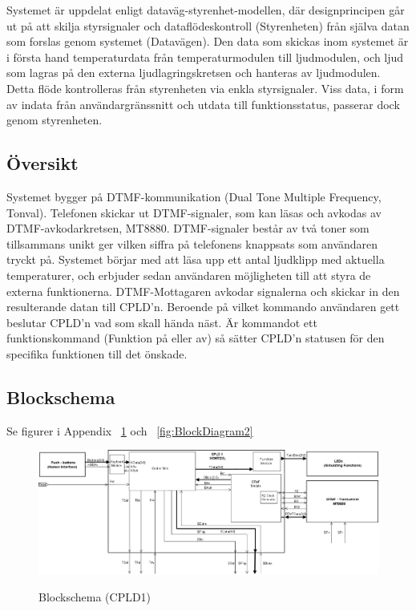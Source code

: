 \documentclass[a4paper,11pt]{article}
\begin{document}
	Systemet är uppdelat enligt dataväg-styrenhet-modellen, där designprincipen går ut på att skilja styrsignaler
	och dataflödeskontroll (Styrenheten) från själva datan som forslas genom systemet (Datavägen). Den data som
	skickas inom systemet är i första hand temperaturdata från temperaturmodulen till ljudmodulen, och ljud som
	lagras på den externa ljudlagringskretsen och hanteras av ljudmodulen. Detta flöde kontrolleras från styrenheten via
	enkla styrsignaler. Viss data, i form av indata från användargränssnitt och utdata till funktionsstatus, passerar
	dock genom styrenheten.

	\subsection{Översikt}

	Systemet bygger på DTMF-kommunikation (Dual Tone Multiple Frequency, Tonval). Telefonen skickar ut DTMF-signaler, som kan
	läsas och avkodas av DTMF-avkodarkretsen, MT8880. DTMF-signaler består av två toner som tillsammans unikt ger vilken
	siffra på telefonens knappsats som användaren tryckt på. Systemet börjar med att läsa upp ett antal ljudklipp med
	aktuella temperaturer, och erbjuder sedan användaren möjligheten till att styra de externa funktionerna.
	DTMF-Mottagaren avkodar signalerna och skickar in den resulterande
	datan till CPLD'n. Beroende på vilket kommando användaren gett beslutar CPLD'n vad som skall hända näst. Är kommandot ett
	funktionskommand (Funktion på eller av) så sätter CPLD'n statusen för den specifika funktionen till det önskade. 

	\subsection{Blockschema}

	Se figurer i Appendix ~\ref{fig:BlockDiagram1} och ~\ref{fig:BlockDiagram2}

	\begin{figure}[ht!]
	  \centering
	      \includegraphics[scale=0.48, angle=90]{BlockDiagramCPLD1.png}
		\label{fig:BlockDiagram1}
	  	\caption{Blockschema (CPLD1)}
	\end{figure}
\end{document}
